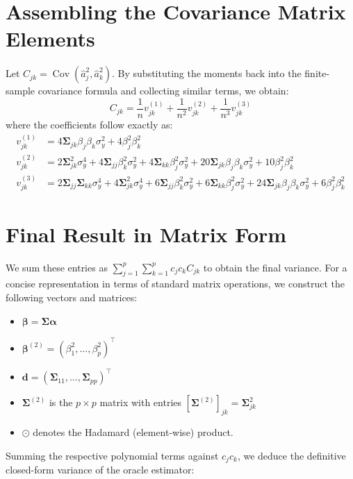 \documentclass[11pt]{article}
\newcommand{\bmSigma}{\boldsymbol{\Sigma}}
\newcommand{\bmalpha}{\boldsymbol{\alpha}}
\newcommand{\bmbeta}{\boldsymbol{\beta}}
\newcommand{\1}{\mathbf{1}}
\begin{document}
\section{Assembling the Covariance Matrix Elements}

Let $C_{jk} = \operatorname{Cov}(\widehat{a}_j^2, \widehat{a}_k^2)$. By substituting the moments back into the finite-sample covariance formula and collecting similar terms, we obtain:
\[
    C_{jk} = \frac{1}{n} v_{jk}^{(1)} + \frac{1}{n^2} v_{jk}^{(2)} + \frac{1}{n^3} v_{jk}^{(3)}
\]
where the coefficients follow exactly as:
\begin{align*}
    v_{jk}^{(1)} &= 4 \bmSigma_{jk} \beta_j \beta_k \sigma_y^2 + 4 \beta_j^2 \beta_k^2 \\
    v_{jk}^{(2)} &= 2 \bmSigma_{jk}^2 \sigma_y^4 + 4 \bmSigma_{jj} \beta_k^2 \sigma_y^2 + 4 \bmSigma_{kk} \beta_j^2 \sigma_y^2 + 20 \bmSigma_{jk} \beta_j \beta_k \sigma_y^2 + 10 \beta_j^2 \beta_k^2 \\
    v_{jk}^{(3)} &= 2 \bmSigma_{jj} \bmSigma_{kk} \sigma_y^4 + 4 \bmSigma_{jk}^2 \sigma_y^4 + 6 \bmSigma_{jj} \beta_k^2 \sigma_y^2 + 6 \bmSigma_{kk} \beta_j^2 \sigma_y^2 + 24 \bmSigma_{jk} \beta_j \beta_k \sigma_y^2 + 6 \beta_j^2 \beta_k^2
\end{align*}

\section{Final Result in Matrix Form}

We sum these entries as $\sum_{j=1}^p \sum_{k=1}^p c_j c_k C_{jk}$ to obtain the final variance. For a concise representation in terms of standard matrix operations, we construct the following vectors and matrices:
\begin{itemize}
    \item $\bmbeta = \bmSigma \bmalpha$
    \item $\bmbeta^{(2)} = (\beta_1^2, \ldots, \beta_p^2)^\top$ 
    \item $\bm{d} = (\bmSigma_{11}, \ldots, \bmSigma_{pp})^\top$
    \item $\bmSigma^{(2)}$ is the $p \times p$ matrix with entries $[\bmSigma^{(2)}]_{jk} = \bmSigma_{jk}^2$
    \item $\odot$ denotes the Hadamard (element-wise) product.
\end{itemize}

Summing the respective polynomial terms against $c_j c_k$, we deduce the definitive closed-form variance of the oracle estimator:
\end{document}
